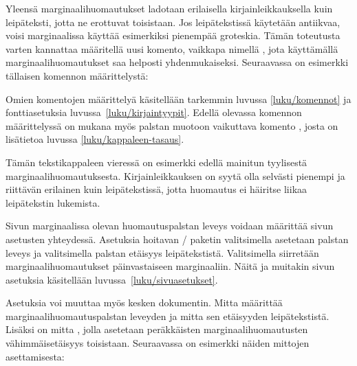 Yleensä marginaalihuomautukset ladotaan erilaisella kirjainleikkauksella
kuin leipäteksti, jotta ne erottuvat toisistaan. Jos leipätekstissä
käytetään antiikvaa, voisi marginaalissa käyttää esimerkiksi pienempää
groteskia. Tämän toteutusta varten kannattaa määritellä uusi komento,
vaikkapa nimellä , jota käyttämällä
marginaalihuomautukset saa helposti yhdenmukaiseksi. Seuraavassa on
esimerkki tällaisen komennon määrittelystä:

\begin{koodilohkosis}
\newcommand{\huomautus}[1]{%
  \marginpar{\sffamily\scriptsize\RaggedRight #1}}
\end{koodilohkosis}

Omien komentojen määrittelyä käsitellään tarkemmin luvussa
\ref{luku/komennot} ja fonttiasetuksia luvussa~\ref{luku/kirjaintyypit}.
Edellä olevassa komennon määrittelyssä on mukana myös palstan muotoon
vaikuttava komento , josta on lisätietoa luvussa
\ref{luku/kappaleen-tasaus}.

Tämän  tekstikappaleen vieressä
on esimerkki edellä mainitun tyylisestä marginaalihuomautuksesta.
Kirjainleikkauksen on syytä olla selvästi pienempi ja riittävän
erilainen kuin leipätekstissä, jotta huomautus ei häiritse liikaa
leipätekstin lukemista. \noclub[3]

Sivun marginaalissa olevan huomautuspalstan leveys voidaan määrittää
sivun asetusten yhteydessä. Asetuksia hoitavan \-/
paketin valitsimella  asetetaan palstan leveys ja
valitsimella  palstan etäisyys leipätekstistä.
Valitsimella  siirretään marginaalihuomautukset
päinvastaiseen marginaaliin. Näitä ja muitakin sivun asetuksia
käsitellään luvussa~\ref{luku/sivuasetukset}.

Asetuksia voi muuttaa myös kesken dokumentin. Mitta
 määrittää marginaalihuomautuspalstan leveyden ja
mitta  sen etäisyyden leipätekstistä. Lisäksi on
mitta , jolla asetetaan peräkkäisten
marginaalihuomautusten vähimmäisetäisyys toisistaan. Seuraavassa on
esimerkki näiden mittojen asettamisesta:

\begin{koodilohkosis}
\setlength{\marginparwidth}{50bp}
\setlength{\marginparsep}{10bp}
\setlength{\marginparpush}{6bp}
\end{koodilohkosis}

